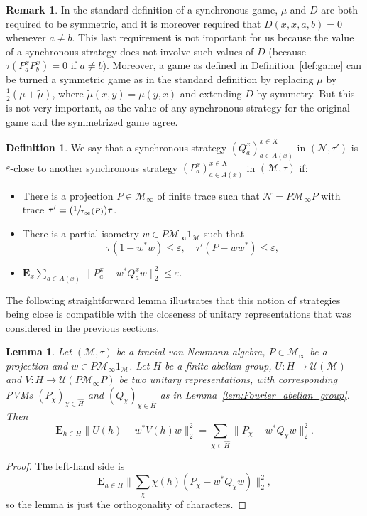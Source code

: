 \documentclass[10pt]{amsart}
\newcommand{\Psfrac}[2]{(\sfrac{#1}{#2})}
\theoremstyle{plain}
\newtheorem{lemma}[theorem]{Lemma}
\theoremstyle{definition}
\newtheorem{definition}[theorem]{Definition}
\newtheorem{remark}[theorem]{Remark}
\newcommand{\cM}{\mathcal{M}}
\newcommand{\cN}{\mathcal{N}}
\newcommand{\E}{\mathbf{E}}
\newcommand{\cU}{\mathcal{U}}
\begin{document}
\begin{remark} In the standard definition of a synchronous game, $\mu$ and $D$ are both required to be symmetric, and it is moreover required that $D(x,x,a,b)=0$ whenever $a \neq b$. This last requirement is not important for us because the value of a synchronous strategy does not involve such values of $D$ (because $\tau(P^x_a P^x_b)=0$ if $a\neq b$). Moreover, a game as defined in Definition~\ref{def:game} can be turned a symmetric game as in the standard definition by replacing $\mu$ by $\frac{1}{2}(\mu + \tilde{\mu})$, where $\tilde{\mu}(x,y)=\mu(y,x)$ and extending $D$ by symmetry. But this is not very important, as the value of any synchronous strategy for the original game and the symmetrized game agree.
\end{remark}
\begin{definition} We say that a synchronous strategy $(Q^x_a)_{a \in A(x)}^{x \in X}$ in $(\cN,\tau')$ is $\varepsilon$-close to another synchronous strategy $(P^x_a)_{a \in A(x)}^{x \in X}$ in $(\cM,\tau)$ if:
\begin{itemize}
\item There is a projection $P \in \cM_\infty$ of finite trace such that $\cN = P \cM_\infty P$ with trace $\tau' = \Psfrac{1}{\tau_\infty(P)} \tau$.
\item There is a partial isometry $w \in P \cM_\infty 1_\cM$ such that
\[
\tau(1-w^*w) \leq \varepsilon,\quad \tau'(P-w w^*)\leq \varepsilon,
\]
\item $\E_x \sum_{a \in A(x)} \|P^x_a - w^* Q^x_a w\|_2^2\leq \varepsilon$.
\end{itemize}
\end{definition}
The following straightforward lemma illustrates that this notion of strategies being close is compatible with the closeness of unitary representations that was considered in the previous sections.
\begin{lemma}\label{lem:close_strategies_unitaries} Let $(\cM,\tau)$ be a tracial von Neumann algebra, $P \in \cM_\infty$ be a projection and $w \in P\cM_\infty 1_\cM$. Let $H$ be a finite abelian group, $U:H\to \cU(\cM)$ and $V:H \to\cU(P\cM_\infty P)$ be two unitary representations, with corresponding PVMs $(P_\chi)_{\chi \in \hat H}$ and $(Q_\chi)_{\chi \in \hat H}$ as in Lemma~\ref{lem:Fourier_abelian_group}. Then
\[
\E_{h\in H} \|U(h) - w^* V(h) w\|_2^2 = \sum_{\chi \in \hat H} \|P_\chi - w^* Q_\chi w\|_2^2.
\]
\end{lemma}
\begin{proof}
The left-hand side is
\[
\E_{h\in H} \|\sum_\chi \chi(h) (P_\chi - w^* Q_\chi w)\|_2^2,
\]
so the lemma is just the orthogonality of characters.\end{proof}
\end{document}
